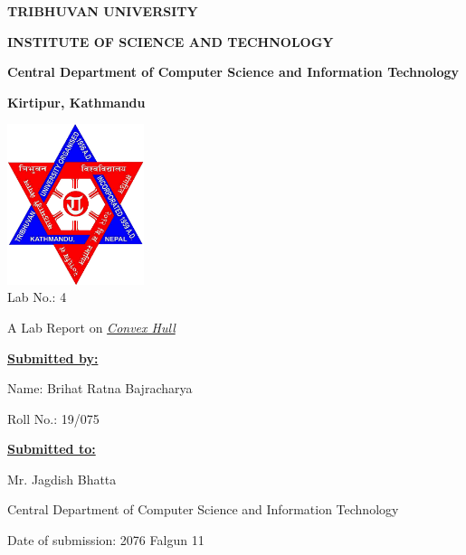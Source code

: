 \thispagestyle{empty}
\begin{center}
  \hfill \break

  \begin{Large}
    \textbf{TRIBHUVAN UNIVERSITY}
  \end{Large}

  \begin{large}
    \textbf{INSTITUTE OF SCIENCE AND TECHNOLOGY}
  \end{large}

  \begin{normalsize}
    \textbf{Central Department of Computer Science and Information Technology}
  \end{normalsize}

  \begin{footnotesize}
    \textbf{Kirtipur, Kathmandu}\\[3cm]
  \end{footnotesize}

  \includegraphics[width=4cm]{../tu_logo.png}\\[3cm]

Lab No.: 4

A Lab Report on \emph{\underline{Convex Hull}}\\[3cm]

  \begin{flushleft}
    \begin{multicols}{2}
      \textbf{\underline{Submitted by:}}

      Name: Brihat Ratna Bajracharya

      Roll No.: 19/075

      \hfill \break

      \textbf{\underline{Submitted to:}}

      Mr. Jagdish Bhatta

      Central Department of Computer Science and Information Technology

    \end{multicols}
  \end{flushleft}

  \hfill \break

  Date of submission: 2076 Falgun 11
\end{center}

\pagebreak
